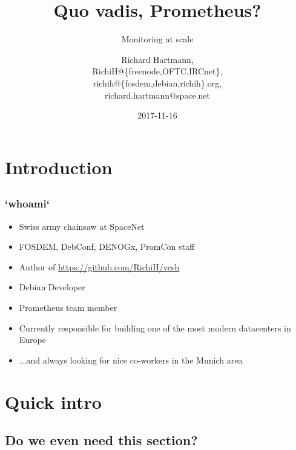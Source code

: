 \documentclass[t]{beamer}
\title{Quo vadis, Prometheus?}
\subtitle{Monitoring at scale}
\author{Richard Hartmann,\\
RichiH@\{freenode,OFTC,IRCnet\},\\
richih@\{fosdem,debian,richih\}.org,\\
richard.hartmann@space.net}
\date{2017-11-16}
\begin{document}
\setcounter{tocdepth}{1}

\section{Introduction}

\subsection{}

\begin{frame}
	\titlepage
\end{frame}


\subsection{}

\begin{frame}
	\frametitle{`whoami`}
	\begin{itemize}
		\item Swiss army chainsaw at SpaceNet
		\item FOSDEM, DebConf, DENOGx, PromCon staff
		\item Author of \url{https://github.com/RichiH/vcsh}
		\item Debian Developer
		\item Prometheus team member
		\item Currently responsible for building one of the most modern datacenters in Europe
		\item ...and always looking for nice co-workers in the Munich area
	\end{itemize}
\end{frame}


\section{Quick intro}

\subsection{Do we even need this section?}

\end{document}
